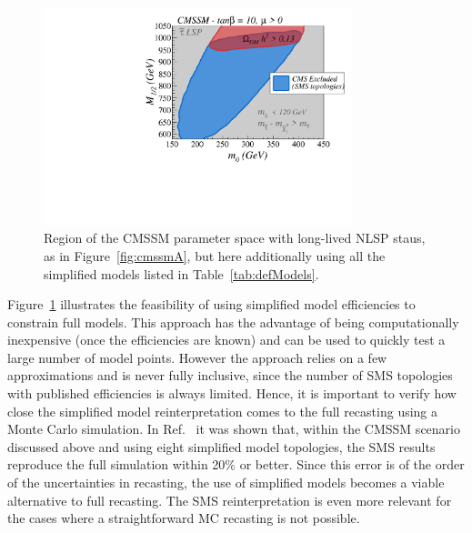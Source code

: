 \begin{figure}[!h]
\centering
\includegraphics[width=0.8\textwidth]{ch5-figures/sms_exclusion_all.pdf}
\caption{Region of the CMSSM parameter space with long-lived NLSP staus, as in Figure~\ref{fig:cmssmA}, but here additionally using all the simplified models listed in Table~\ref{tab:defModels}.
}
\label{fig:cmssmB}
\end{figure}

Figure~\ref{fig:cmssmB} illustrates the feasibility of using simplified
model efficiencies to constrain full models.
This approach has the advantage of being computationally inexpensive
(once the efficiencies are known) and can be used to quickly test
a large number of model points. However the approach relies on a few
approximations and is never fully inclusive, since the number of SMS topologies
with published efficiencies is always limited.
Hence, it is important to verify
how close the simplified model reinterpretation comes to the full recasting
using a Monte Carlo simulation.
In Ref.~\cite{Heisig:2015yla} it was shown that, within
the CMSSM scenario discussed above and using eight simplified model
topologies, the SMS results reproduce the full simulation within
20\% or better.
Since this error is of the order of the uncertainties in recasting,
the use of simplified models becomes a viable alternative to full recasting.
The SMS reinterpretation is even more relevant for the cases
where a straightforward MC recasting is not possible.

\vskip 0.1in
\vskip 0.1in

